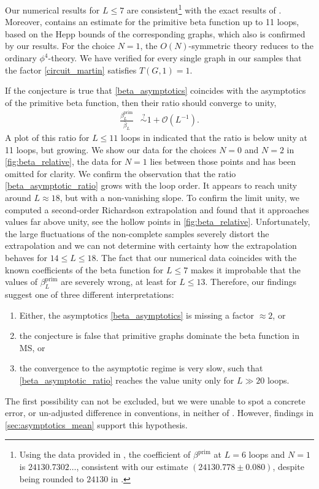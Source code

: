 \documentclass[12pt,a4paper]{article}
\renewcommand{\|}{\rule[-0.4ex]{0.2ex}{1.2em}}
\begin{document}
Our numerical results for $L \leq 7$ are consistent\footnote{Using the data provided in \cite{panzer_galois_2017}, the coefficient of  $\beta^\text{prim}$ at $L=6$ loops and $N=1$ is  $24130.7302\ldots$, consistent with our estimate $(24130.778 \pm 0.080)$, despite being rounded to $24130$ in \cite{kompaniets_minimally_2017}.} with the exact results of  \cite{kompaniets_minimally_2017}.
Moreover, \cite[Appendix B]{kompaniets_minimally_2017} contains an estimate for the primitive beta function up to 11 loops, based on the Hepp bounds of the corresponding graphs, which also is confirmed by our results. 
For the choice $N=1$, the $O(N)$-symmetric theory reduces to the ordinary $\phi^4$-theory. We have verified for every single graph in our samples that the factor \cref{circuit_martin} satisfies $T(G,1)=1$.




If the conjecture is true that \cref{beta_asymptotics} coincides with the asymptotics of the primitive beta function, then their ratio should converge to unity,
\begin{align}\label{beta_asymptotic_ratio}
\frac{\beta^{\text{prim}}_L}{\bar \beta_L} &\overset ?\sim 1 + \mathcal O\left( L^{-1} \right) .
\end{align}
A plot of this ratio for $L \leq 11$ loops in  \cite[Figure 1]{kompaniets_minimally_2017} indicated that the ratio is below unity at 11 loops, but growing. We show our data for the choices $N=0$ and $N=2$ in \cref{fig:beta_relative}, the data for $N=1$ lies between those points and has been omitted for clarity. We confirm the observation that the ratio \cref{beta_asymptotic_ratio} grows with the loop order. It appears to reach unity around $L\approx 18$, but with a non-vanishing slope. To confirm the limit unity, we computed a second-order Richardson extrapolation and found that it approaches values far above unity, see the hollow points in \cref{fig:beta_relative}. Unfortunately, the large fluctuations of  the non-complete samples   severely distort the extrapolation and we   can not  determine with certainty how the extrapolation behaves for $14 \leq L \leq 18$. The fact that our numerical data coincides with the known coefficients of the beta function for $L \leq 7$ makes it improbable that the values of $\beta^\text{prim}_L$ are severely wrong, at least for $L \leq 13$. Therefore, our findings suggest one of three different interpretations: 
\begin{enumerate}
	\item Either,   the asymptotics \cref{beta_asymptotics} is missing a factor $\approx 2$, or
	\item the conjecture is false that primitive graphs dominate the beta function in MS,  or
	\item  the convergence to the asymptotic regime is very slow, such that \cref{beta_asymptotic_ratio} reaches the value unity only for $L\gg 20$ loops.
\end{enumerate}
The first possibility can not be excluded, but we were unable to spot a concrete error, or un-adjusted difference in conventions, in neither of \cite{mckane_nonperturbative_1984,mckane_perturbation_2019,kompaniets_minimally_2017}.  However, findings in \cref{sec:asymptotics_mean} support this hypothesis. 
\end{document}
